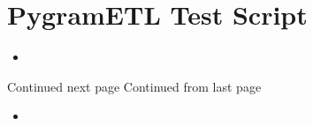 \section{PygramETL Test Script}\label{pygrametlTS}
\begin{itemize}
\item[]
\end{itemize}
Continued next page
\clearpage
Continued from last page
\begin{itemize}
\item[]
\end{itemize}
